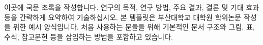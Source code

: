 	이곳에 국문 초록을 작성합니다. 연구의 목적, 연구 방법, 주요 결과, 결론 및 기대 효과 등을 간략하게 요약하여 기술하십시오.
	본 템플릿은 부산대학교 대학원 학위논문 작성을 위한 예시 양식입니다.  처음 사용하는 분들을 위해 기본적인 문서 구조와 그림, 표, 수식, 참고문헌 등을 삽입하는 방법을 포함하고 있습니다.